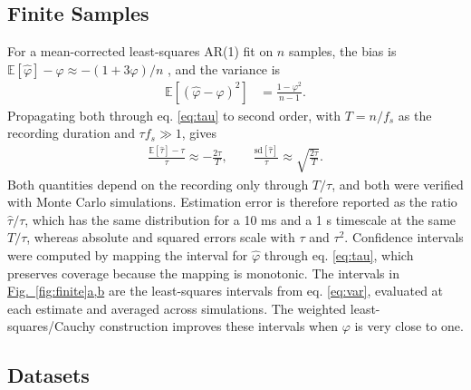 \documentclass[pdflatex,lineno,sn-nature]{sn-jnl}
\newcommand{\figpanel}[3][]{\hyperref[#2]{Fig.~#1\ref*{#2}#3}}
\theoremstyle{thmstyleone}
\theoremstyle{thmstyletwo}
\theoremstyle{thmstylethree}
\begin{document}
\subsection{Finite Samples}

For a mean-corrected least-squares AR(1) fit on $n$ samples, the bias is $\mathbb{E}[\hat\varphi] - \varphi \approx -(1+3\varphi)/n$ \cite{marriott_bias_1954, kendall_note_1954}, and the variance is
\begin{align}
\mathbb{E}[ (\hat{\varphi} - \varphi)^2 ] &= \frac{1 - \varphi^2}{n-1}. \label{eq:var}
\end{align}
Propagating both through eq. \ref{eq:tau} to second order, with $T = n/f_s$ as the recording duration and $\tau f_s \gg 1$, gives
\begin{align}
\frac{\mathbb{E}[\hat\tau] - \tau}{\tau} \approx -\frac{2\tau}{T}, \qquad
\frac{\mathrm{sd}[\hat\tau]}{\tau} \approx \sqrt{\frac{2\tau}{T}}. \label{eq:finite}
\end{align}
Both quantities depend on the recording only through $T/\tau$, and both were verified with Monte Carlo simulations. Estimation error is therefore reported as the ratio $\hat\tau/\tau$, which has the same distribution for a 10 ms and a 1 s timescale at the same $T/\tau$, whereas absolute and squared errors scale with $\tau$ and $\tau^2$. Confidence intervals were computed by mapping the interval for $\hat\varphi$ through eq. \ref{eq:tau}, which preserves coverage because the mapping is monotonic. The intervals in \figpanel{fig:finite}{a,b} are the least-squares intervals from eq. \ref{eq:var}, evaluated at each estimate and averaged across simulations. The weighted least-squares/Cauchy construction \cite{gallagher_small_2008} improves these intervals when $\varphi$ is very close to one.

\subsection{Datasets}
\end{document}
